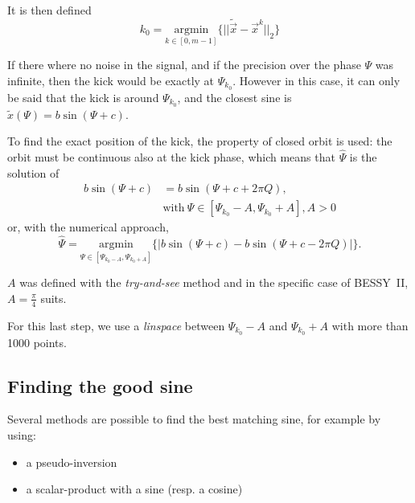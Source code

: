 It is then defined
\begin{equation}
k_0 = \underset{k \in [0, m-1]}{\textrm{argmin}}\{||\tilde{\vec{x}}-\vec{x}^k||_2\}
\end{equation}

If there where no noise in the signal, and if the precision over the phase $\Psi$ was infinite, then the kick would be exactly at $\Psi_{k_0}$. However in this case, it can only be said that the kick is around $\Psi_{k_0}$, and the closest sine is $\tilde{x}(\Psi) = b \sin(\Psi + c)$.

To find the exact position of the kick, the property of closed orbit is used: the orbit must be continuous also at the kick phase, which means that $\hat{\Psi}$ is the solution of
\begin{align}
b \sin(\Psi + c) &= b\sin(\Psi+c+2 \pi Q),\\
& \mathrm{with}~ \Psi \in [\Psi_{k_0}-A, \Psi_{k_0}+A] , A>0 \nonumber
\end{align}
or, with the numerical approach, 
\begin{equation}
\hat{\Psi} =  \underset{\Psi \in [\Psi_{k_0-A}, \Psi_{k_0+A}]}{\textrm{argmin}}\{|b \sin(\Psi + c) - b\sin(\Psi+c-2 \pi Q)|\}.
\end{equation}

$A$ was defined with the \textit{try-and-see} method and in the specific case of BESSY~II, $A=\frac{\pi}{4}$ suits.

\remark For this last step, we use a \textit{linspace} between $\Psi_{k_0}-A$ and $\Psi_{k_0}+A$ with more than 1000 points.

\subsection{Finding the good sine}
Several methods are possible to find the best matching sine, for example by using:
\begin{itemize}
	\item a pseudo-inversion
	\item a scalar-product with a sine (resp. a cosine)
\end{itemize}

